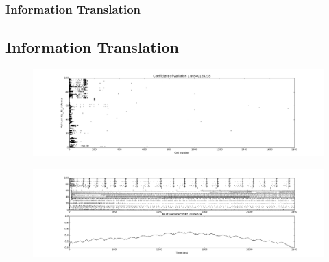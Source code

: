 \documentclass{beamer}
\begin{document}
\begin{frame}
\frametitle{Information Translation}
\subsection{Information Translation}


\begin{figure}
\includegraphics[scale=0.2]{kreuz_multivariatem_isi050025001_00100_0101.png}
\end{figure}

\begin{figure}
\includegraphics[scale=0.2]{kreuz_multivariatem_spike_distance050025001_00100_0101.png}
\end{figure}


\end{frame}
\end{document}
